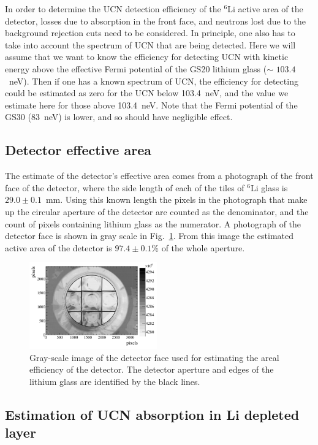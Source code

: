 \documentclass[letter,twocolumn,preprint,3p,numbers,sort&compress]{elsarticle}
\begin{document}
In order to determine the UCN detection efficiency of the $^{6}$Li
active area of the detector, losses due to absorption in the front
face, and neutrons lost due to the background rejection cuts need to
be considered.  In principle, one also has to take into account the
spectrum of UCN that are being detected.  Here we will assume that we
want to know the efficiency for detecting UCN with kinetic energy
above the effective Fermi potential of the GS20 lithium glass ($\sim$
$103.4$~neV).  Then if one has a known spectrum of UCN, the efficiency
for detecting could be estimated as zero for the UCN below 103.4~neV,
and the value we estimate here for those above 103.4~neV.  Note that
the Fermi potential of the GS30 (83~neV) is lower, and so should have
negligible effect.


\subsection{ Detector effective area }

The estimate of the detector's effective area comes from a photograph
of the front face of the detector, where the side length of each of
the tiles of $^6$Li glass is $29.0\pm0.1$~mm.  Using this known length
the pixels in the photograph that make up the circular aperture of the
detector are counted as the denominator, and the count of pixels
containing lithium glass as the numerator.  A photograph of the
detector face is shown in gray scale in Fig.~\ref{fig:detface}.  From
this image the estimated active area of the detector is $97.4\pm0.1$\%
of the whole aperture.

\begin{figure}[!htpb]
\centering \includegraphics[width = 0.49\textwidth]{figures/detface.pdf}
\caption{Gray-scale image of the detector face used for estimating the
  areal efficiency of the detector.  The detector aperture and edges
  of the lithium glass are identified by the black lines.}
\label{fig:detface}
\end{figure}

\subsection{ Estimation of UCN absorption in Li depleted layer }
\end{document}
